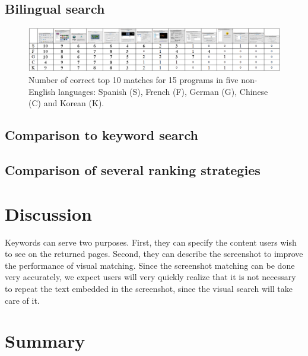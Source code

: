 \documentclass{www2010-submission}
\begin{document}
\subsection{Bilingual search}

\begin{figure}
\includegraphics[width=2\columnwidth]{figure/bilingual_search.png}
\caption{Number of correct top 10 matches for 15 programs in five non-English
languages: Spanish (S), French (F), German (G), Chinese (C) and Korean (K).}
\end{figure}


\subsection{Comparison to keyword search}

\subsection{Comparison of several ranking strategies}

\section{Discussion}

Keywords can serve two purposes. First, they can specify the
content users wish to see on the returned pages. Second, they can
describe the screenshot to improve the performance of visual
matching. Since the screenshot matching can be done very
accurately, we expect users will very quickly realize that it is
not necessary to repeat the text embedded in the screenshot, since
the visual search will take care of it.


\section{Summary}


\balancecolumns %
\end{document}

